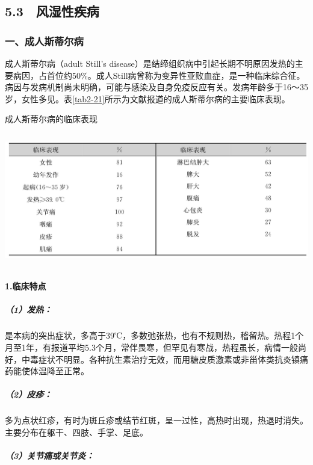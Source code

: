 \protect\hypertarget{text00035.html}{}{}

\subsection{5.3　风湿性疾病}

\subsubsection{一、成人斯蒂尔病}

成人斯蒂尔病（adult Still's
disease）是结缔组织病中引起长期不明原因发热的主要病因，占首位约50\%。成人Still病曾称为变异性亚败血症，是一种临床综合征。病因与发病机制尚未明确，可能与感染及自身免疫反应有关。发病年龄多于16～35岁，女性多见。表\ref{tab2-21}所示为文献报道的成人斯蒂尔病的主要临床表现。

\begin{table}[htbp]
\centering
\caption{成人斯蒂尔病的临床表现}
\label{tab2-21}
\includegraphics[width=5.9375in,height=2.29167in]{./images/Image00027.jpg}
\end{table}

\paragraph{1.临床特点}

\subparagraph{（1）发热：}

是本病的突出症状，多高于39℃，多数弛张热，也有不规则热，稽留热。热程1个月至1年，有报道平均5.3个月，常伴畏寒，但罕见有寒战，热程虽长，病情一般尚好，中毒症状不明显。各种抗生素治疗无效，而用糖皮质激素或非甾体类抗炎镇痛药能使体温降至正常。

\subparagraph{（2）皮疹：}

多为点状红疹，有时为斑丘疹或结节红斑，呈一过性，高热时出现，热退时消失。主要分布在躯干、四肢、手掌、足底。

\subparagraph{（3）关节痛或关节炎：}


